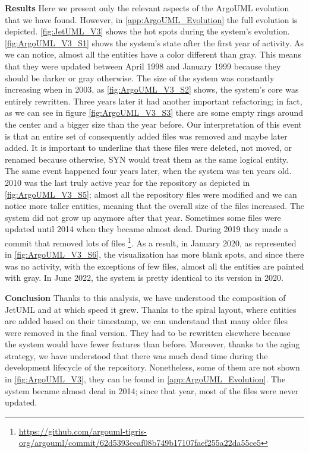 \textbf{Results}
Here we present only the relevant aspects of the ArgoUML evolution that we have found. However, in \autoref{app:ArgoUML_Evolution} the full evolution is depicted. \autoref{fig:JetUML_V3} shows the hot spots during the system's evolution. \autoref{fig:ArgoUML_V3_S1} shows the system's state after the first year of activity. As we can notice, almost all the entities have a color different than gray. This means that they were updated between April 1998 and January 1999 because they should be darker or gray otherwise. The size of the system was constantly increasing when in 2003, as \autoref{fig:ArgoUML_V3_S2} shows, the system's core was entirely rewritten. Three years later it had another important refactoring; in fact, as we can see in figure \autoref{fig:ArgoUML_V3_S3} there are some empty rings around the center and a bigger size than the year before. Our interpretation of this event is that an entire set of consequently added files was removed and maybe later added. It is important to underline that these files were deleted, not moved, or renamed because otherwise, SYN would treat them as the same logical entity. The same event happened four years later, when the system was ten years old. 2010 was the last truly active year for the repository as depicted in \autoref{fig:ArgoUML_V3_S5}; almost all the repository files were modified and we can notice more taller entities, meaning that the overall size of the files increased. The system did not grow up anymore after that year. Sometimes some files were updated until 2014 when they became almost dead. During 2019 they made a commit that removed lots of files \footnote{\url{https://github.com/argouml-tigris-org/argouml/commit/62d5393eeaf08b749b17107faef255a22da55ce5}}. As a result, in January 2020, as represented in \autoref{fig:ArgoUML_V3_S6}, the visualization has more blank spots, and since there was no activity, with the exceptions of few files, almost all the entities are painted with gray. In June 2022, the system is pretty identical to its version in 2020. 


\textbf{Conclusion}
Thanks to this analysis, we have understood the composition of JetUML and at which speed it grew. Thanks to the spiral layout, where entities are added based on their timestamp, we can understand that many older files were removed in the final version. They had to be rewritten elsewhere because the system would have fewer features than before. Moreover, thanks to the aging strategy, we have understood that there was much dead time during the development lifecycle of the repository. Nonetheless, some of them are not shown in \autoref{fig:ArgoUML_V3}, they can be found in \autoref{app:ArgoUML_Evolution}. The system became almost dead in 2014; since that year, most of the files were never updated. 



